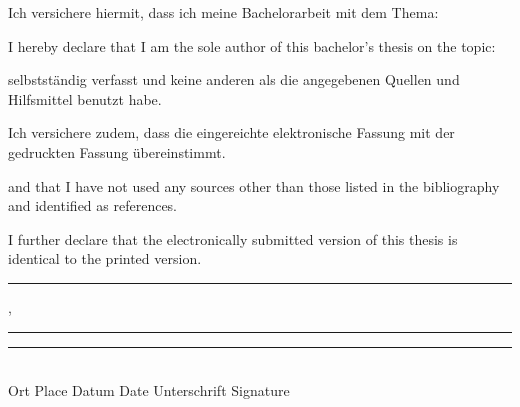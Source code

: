 \vfill
\begin{paracol}{2}
    \begin{leftcolumn}
        Ich versichere hiermit, dass ich meine Bachelorarbeit mit dem Thema:
    \end{leftcolumn}
    
    \begin{rightcolumn}
        \color{gray}
        I hereby declare that I am the sole author of this bachelor's thesis on the topic:
    \end{rightcolumn}
\end{paracol}

\begin{center}
    \vspace{1cm}
    \textit{\@title}
    \vspace{1cm}
\end{center}

\begin{paracol}{2}
    \begin{leftcolumn}
        selbstst\"andig verfasst und keine anderen als die angegebenen Quellen und Hilfsmittel benutzt habe. 
        
        Ich versichere zudem, dass die eingereichte elektronische Fassung mit der gedruckten Fassung \"ubereinstimmt.
    \end{leftcolumn}
    
    \begin{rightcolumn}
        \color{gray}
        and that I have not used any sources other than those listed in the bibliography and identified as references. 
        
        I further declare that the electronically submitted version of this thesis is identical to the printed version.
    \end{rightcolumn}
    
\end{paracol}

\vfill

\rule{3,5cm}{0.4pt}, \rule{3,5cm}{0.4pt} \hspace{0.38cm} \rule{7cm}{0.4pt}\\
Ort {\color{gray}Place}
\hspace{1.8cm}
Datum {\color{gray}Date}
\hspace{1.6cm}
Unterschrift {\color{gray}Signature}



\vfill